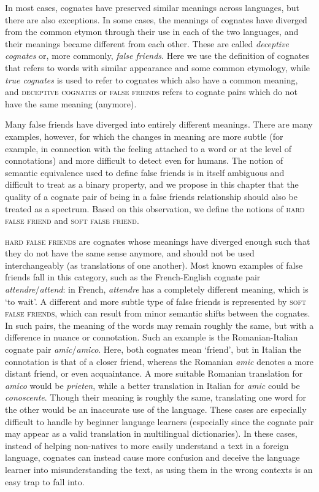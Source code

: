 \documentclass[output=paper]{langsci/langscibook}
\begin{document}
In most cases, cognates have preserved similar meanings across languages, but there are also exceptions. In some cases, the meanings of cognates have diverged from the common etymon through their use in each of the two languages, and their meanings became different from each other. These are called \textit{deceptive cognates} or, more commonly, \textit{false friends}. Here we use the definition of cognates that refers to words with similar appearance and some common etymology, while \textit{true cognates} is used to refer to cognates which also have a common meaning, and \textsc{deceptive cognates} or \textsc{false friends} refers to cognate pairs which do not have the same meaning (anymore).

Many false friends have diverged into entirely different meanings. There are many examples, however, for which the changes in meaning are more subtle (for example, in connection with the feeling attached to a word or at the level of connotations) and more difficult to detect even for humans. The notion of semantic equivalence used to define false friends is in itself ambiguous and difficult to treat as a binary property, and we propose in this chapter that the quality of a cognate pair of being in a false friends relationship should also be treated as a spectrum. Based on this observation, we define the notions of \textsc{hard false friend} and \textsc{soft false friend}.

\textsc{hard false friends} are cognates whose meanings have diverged enough such that they do not have the same sense anymore, and should not be used interchangeably (as translations of one another). Most known examples of false friends fall in this category, such as the French-English cognate pair \textit{attendre}\slash\textit{at\-tend}: in French, \textit{attendre} has a completely different meaning, which is `to wait'. A different and more subtle type of false friends is represented by \textsc{soft false friends}, which can result from minor semantic shifts between the cognates. In such pairs, the meaning of the words may remain roughly the same, but with a difference in nuance or connotation. Such an example is the Romanian-Italian cognate pair \textit{amic}/\textit{amico}. Here, both cognates mean `friend', but in Italian the connotation is that of a closer friend, whereas the Romanian \textit{amic} denotes a more distant friend, or even acquaintance. A more suitable Romanian translation for \textit{amico} would be \textit{prieten}, while a better translation in Italian for \textit{amic} could be \textit{conoscente}. Though their meaning is roughly the same, translating one word for the other would be an inaccurate use of the language. These cases are especially difficult to handle by beginner language learners (especially since the cognate pair may appear as a valid translation in multilingual dictionaries). In these cases, instead of helping non-natives to more easily understand a text in a foreign language, cognates can instead cause more confusion and deceive the language learner into misunderstanding the text, as  using them in the wrong contexts is an easy trap to fall into.
\end{document}
